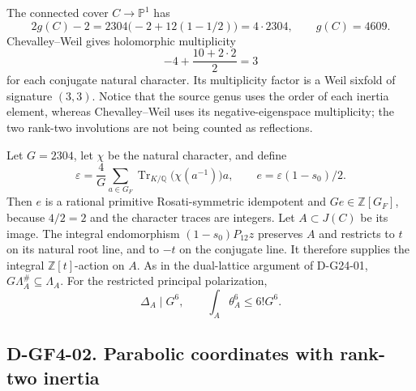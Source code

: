 The connected cover \(C\to\mathbb P^1\) has
\[
 2g(C)-2=2304\bigl(-2+12(1-1/2)\bigr)=4\cdot2304,
 \qquad g(C)=4609.
\]
Chevalley--Weil \cite[Theorem 2.10]{G34:FGP} gives holomorphic multiplicity
\[
                     -4+\frac{10+2\cdot2}{2}=3
\]
for each conjugate natural character.  Its multiplicity factor is a
Weil sixfold of signature \((3,3)\).  Notice that the source genus uses
the order of each inertia element, whereas Chevalley--Weil uses its
negative-eigenspace multiplicity; the two rank-two involutions are not
being counted as reflections.

Let \(G=2304\), let \(\chi\) be the natural character, and define
\[
 \varepsilon=\frac4G\sum_{a\in G_F}
       \operatorname{Tr}_{K/\mathbb Q}\bigl(\chi(a^{-1})\bigr)a,
 \qquad e=\varepsilon(1-s_0)/2.
\]
Then \(e\) is a rational primitive Rosati-symmetric idempotent and
\(Ge\in\mathbb Z[G_F]\), because \(4/2=2\) and the character traces
are integers.  Let \(A\subset J(C)\) be its image.  The integral
endomorphism \((1-s_0)P_{12}z\) preserves \(A\) and restricts to \(t\)
on its natural root line, and to \(-t\) on the conjugate line.  It therefore
supplies the integral \(\mathbb Z[t]\)-action on \(A\).  As in the
dual-lattice argument of D-G24-01, \(G\Lambda_A^\#\subseteq\Lambda_A\).
For the restricted principal polarization,
\begin{equation}\label{eq:gf4-source-delta}
        \Delta_A\mid G^6,\qquad \int_A\theta_A^6\le6!G^6.
\end{equation}

\subsection*{D-GF4-02. Parabolic coordinates with rank-two inertia}

